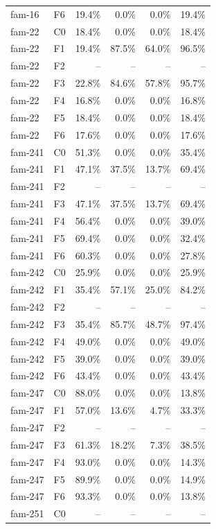 \begin{tabular}{llrrrr}
fam-16 & F6 & 19.4\% & 0.0\% & 0.0\% & 19.4\% \\
fam-22 & C0 & 18.4\% & 0.0\% & 0.0\% & 18.4\% \\
fam-22 & F1 & 19.4\% & 87.5\% & 64.0\% & 96.5\% \\
fam-22 & F2 & -- & -- & -- & -- \\
fam-22 & F3 & 22.8\% & 84.6\% & 57.8\% & 95.7\% \\
fam-22 & F4 & 16.8\% & 0.0\% & 0.0\% & 16.8\% \\
fam-22 & F5 & 18.4\% & 0.0\% & 0.0\% & 18.4\% \\
fam-22 & F6 & 17.6\% & 0.0\% & 0.0\% & 17.6\% \\
fam-241 & C0 & 51.3\% & 0.0\% & 0.0\% & 35.4\% \\
fam-241 & F1 & 47.1\% & 37.5\% & 13.7\% & 69.4\% \\
fam-241 & F2 & -- & -- & -- & -- \\
fam-241 & F3 & 47.1\% & 37.5\% & 13.7\% & 69.4\% \\
fam-241 & F4 & 56.4\% & 0.0\% & 0.0\% & 39.0\% \\
fam-241 & F5 & 69.4\% & 0.0\% & 0.0\% & 32.4\% \\
fam-241 & F6 & 60.3\% & 0.0\% & 0.0\% & 27.8\% \\
fam-242 & C0 & 25.9\% & 0.0\% & 0.0\% & 25.9\% \\
fam-242 & F1 & 35.4\% & 57.1\% & 25.0\% & 84.2\% \\
fam-242 & F2 & -- & -- & -- & -- \\
fam-242 & F3 & 35.4\% & 85.7\% & 48.7\% & 97.4\% \\
fam-242 & F4 & 49.0\% & 0.0\% & 0.0\% & 49.0\% \\
fam-242 & F5 & 39.0\% & 0.0\% & 0.0\% & 39.0\% \\
fam-242 & F6 & 43.4\% & 0.0\% & 0.0\% & 43.4\% \\
fam-247 & C0 & 88.0\% & 0.0\% & 0.0\% & 13.8\% \\
fam-247 & F1 & 57.0\% & 13.6\% & 4.7\% & 33.3\% \\
fam-247 & F2 & -- & -- & -- & -- \\
fam-247 & F3 & 61.3\% & 18.2\% & 7.3\% & 38.5\% \\
fam-247 & F4 & 93.0\% & 0.0\% & 0.0\% & 14.3\% \\
fam-247 & F5 & 89.9\% & 0.0\% & 0.0\% & 14.9\% \\
fam-247 & F6 & 93.3\% & 0.0\% & 0.0\% & 13.8\% \\
fam-251 & C0 & -- & -- & -- & -- \\

\end{tabular}
